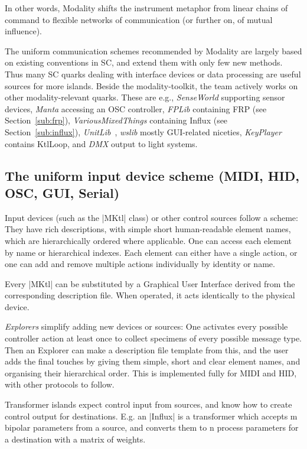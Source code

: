 \documentclass{article}
\begin{document}
In other words, Modality shifts the instrument metaphor from linear chains of command to flexible networks of communication (or further on, of mutual influence).

The uniform communication schemes recommended by Modality are largely based on existing conventions in SC, and extend them with only few new methods. Thus many SC quarks dealing with interface devices or data processing are useful sources for more islands. 
Beside the modality-toolkit\cite{githubmodality}, the team actively works on other modality-relevant quarks.
These are e.g., 
\emph{SenseWorld} supporting sensor devices, 
\emph{Manta} accessing an OSC controller, 
\emph{FPLib} containing FRP (see Section~\ref{sub:frp}), 
\emph{VariousMixedThings} containing Influx (see Section~\ref{sub:influx}), 
\emph{UnitLib}~\cite{-uni}, 
\emph{wslib} mostly GUI-related niceties, 
\emph{KeyPlayer} contains KtlLoop, and 
\emph{DMX} output to light systems.


\subsection{The uniform input device scheme (MIDI, HID, OSC, GUI, Serial)}
\label{sub:the_uniform_input_device_scheme_midi_hid_osc_gui_serial_}

Input devices (such as the |MKtl| class) or other control sources follow a scheme:
They have rich descriptions, with simple short human-readable element names, which are hierarchically ordered where applicable. 
One can access each element by name or hierarchical indexes.
Each element can either have a single action, or one can add and remove multiple actions individually by identity or name.

Every |MKtl| can be substituted by a Graphical User Interface derived from the corresponding description file.
When operated, it acts identically to the physical device.

\emph{Explorers} simplify adding new devices or sources: 
One activates every possible controller action at least once to collect specimens of every possible message type. 
Then an Explorer can make a description file template from this, and the user adds the final touches by giving them simple, short and clear element names, and organising their hierarchical order. 
This is implemented fully for MIDI and HID, with other protocols to follow.

Transformer islands expect control input from sources, and know how to create control output for destinations. E.g. an |Influx| is a transformer which accepts m bipolar parameters from a source, and converts them to n process parameters for a destination with a matrix of weights. 
\end{document}
